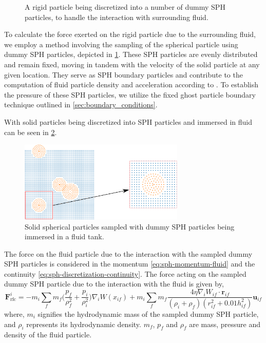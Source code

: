 \documentclass[preprint,12pt]{elsarticle}
\newcommand{\ten}[1]{\ensuremath{\mathbf{#1}}}
\begin{document}
\begin{figure}[!htpb]
\begin{subfigure}{0.24\textwidth}
  \end{subfigure}
  \caption{A rigid particle being discretized into a number of dummy SPH
    particles, to handle the interaction with surrounding fluid.}
\label{fig:real_particle_sph_sampling}
\end{figure}
To calculate the force exerted on the rigid particle due to the surrounding
fluid, we employ a method involving the sampling of the spherical particle
using dummy SPH particles, depicted in
\cref{fig:real_particle_sph_sampling}. These SPH particles are evenly
distributed and remain fixed, moving in tandem with the velocity of the
solid particle at any given location.  They serve as SPH boundary particles
and contribute to the computation of fluid particle density and acceleration
according to .
To establish the pressure of these SPH particles, we utilize the fixed ghost
particle boundary technique outlined in \cref{sec:boundary_conditions}.


With solid particles being discretized into SPH particles and immersed in
fluid can be seen in \cref{fig:many_rb_in_fluid_sph_particles}.
\begin{figure}[!htpb]
  \centering
  \includegraphics[width=0.7\textwidth]{images/rfc_zoomed_combined}
  \caption{Solid spherical particles sampled with dummy SPH particles being
    immersed in a fluid tank.}
  \label{fig:many_rb_in_fluid_sph_particles}
\end{figure}
The force on the fluid particle due to the
interaction with the sampled dummy SPH particles is considered in the momentum
\cref{eq:sph-momentum-fluid} and the continuity
\cref{eq:sph-discretization-continuity}. The force acting on the sampled dummy
SPH particle due to the interaction with the fluid is given by,
\begin{equation}
  \label{eq:rfc-force}
  \ten{F}_{\text{rfc}}^i = -m_i \sum_{f} m_f \bigg(\frac{p_f}{\rho_{f}^2} +
  \frac{p_i}{\rho_{i}^2}\bigg) \nabla_{i} W(x_{if}) +
  m_i \sum_{f} m_f \frac{4 \eta \nabla_i W_{if}\cdot
    \ten{r}_{if}}{(\rho_i + \rho_f) (r_{if}^2 + 0.01 h_{if}^2)} \ten{u}_{if}
\end{equation}
where, $m_i$ signifies the hydrodynamic mass of the sampled dummy SPH particle,
and $\rho_i$ represents its hydrodynamic density. $m_f$, $p_f$ and
$\rho_f$ are mass, pressure and density of the fluid particle.
\end{document}
